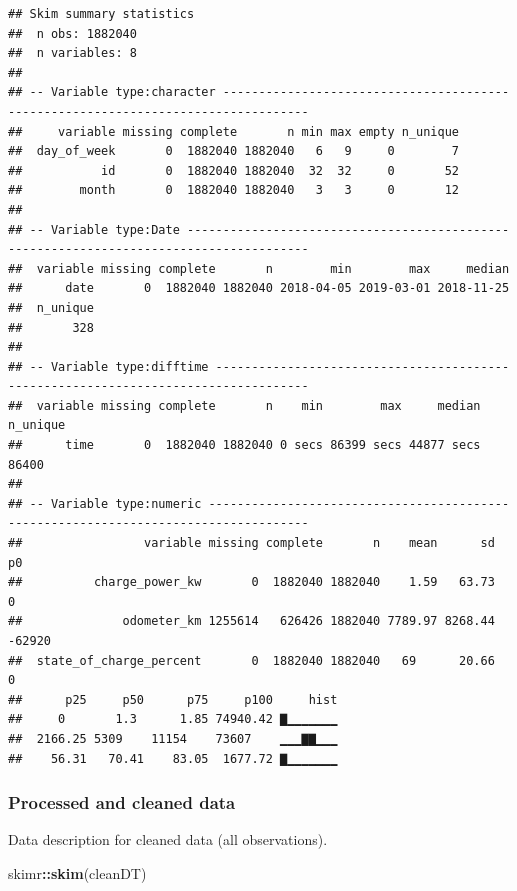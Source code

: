 \documentclass[]{article}
\newenvironment{Shaded}{\begin{snugshade}}{\end{snugshade}}
\newcommand{\KeywordTok}[1]{\textcolor[rgb]{0.13,0.29,0.53}{\textbf{#1}}}
\newcommand{\NormalTok}[1]{#1}
\newcommand{\OperatorTok}[1]{\textcolor[rgb]{0.81,0.36,0.00}{\textbf{#1}}}
\begin{document}
\begin{verbatim}
## Skim summary statistics
##  n obs: 1882040 
##  n variables: 8 
## 
## -- Variable type:character ----------------------------------------------------------------------------------
##     variable missing complete       n min max empty n_unique
##  day_of_week       0  1882040 1882040   6   9     0        7
##           id       0  1882040 1882040  32  32     0       52
##        month       0  1882040 1882040   3   3     0       12
## 
## -- Variable type:Date ---------------------------------------------------------------------------------------
##  variable missing complete       n        min        max     median
##      date       0  1882040 1882040 2018-04-05 2019-03-01 2018-11-25
##  n_unique
##       328
## 
## -- Variable type:difftime -----------------------------------------------------------------------------------
##  variable missing complete       n    min        max     median n_unique
##      time       0  1882040 1882040 0 secs 86399 secs 44877 secs    86400
## 
## -- Variable type:numeric ------------------------------------------------------------------------------------
##                 variable missing complete       n    mean      sd     p0
##          charge_power_kw       0  1882040 1882040    1.59   63.73      0
##              odometer_km 1255614   626426 1882040 7789.97 8268.44 -62920
##  state_of_charge_percent       0  1882040 1882040   69      20.66      0
##      p25     p50      p75     p100     hist
##     0       1.3      1.85 74940.42 ▇▁▁▁▁▁▁▁
##  2166.25 5309    11154    73607    ▁▁▁▇▇▁▁▁
##    56.31   70.41    83.05  1677.72 ▇▁▁▁▁▁▁▁
\end{verbatim}

\hypertarget{processedCheck}{%
\subsubsection{Processed and cleaned data}\label{processedCheck}}

Data description for cleaned data (all observations).

\begin{Shaded}
\begin{Highlighting}[]
\NormalTok{skimr}\OperatorTok{::}\KeywordTok{skim}\NormalTok{(cleanDT)}
\end{Highlighting}
\end{Shaded}
\end{document}
